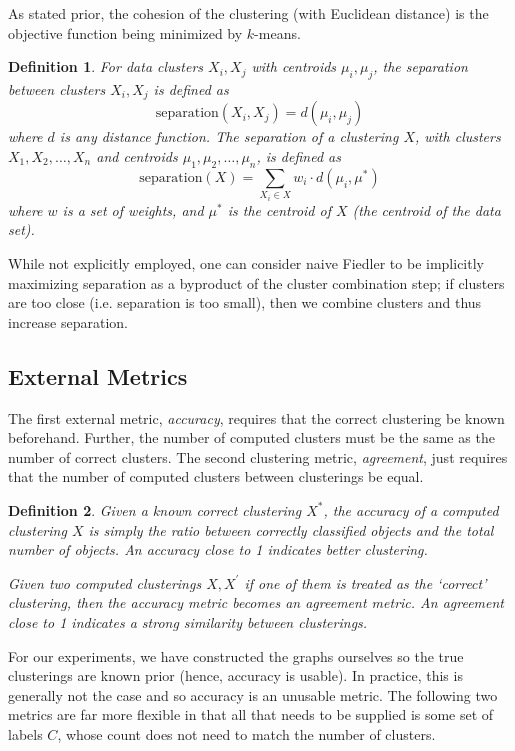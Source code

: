 \documentclass[11pt, letterpaper]{article}
\theoremstyle{perchance}
\newtheorem*{definition}{Definition}
\begin{document}
        As stated prior, the cohesion of the clustering (with Euclidean distance) is the objective function being minimized by $k$-means.
        
        \begin{definition}
            For data clusters $X_i, X_j$ with centroids $\mu_i, \mu_j$, the \emph{separation} between clusters $X_i, X_j$ is defined as
            \[\text{separation}(X_i, X_j) = d(\mu_i, \mu_j)\]
            where $d$ is any distance function. The separation of a clustering $X$, with clusters $X_1, X_2, \ldots, X_n$ and centroids $\mu_1, \mu_2, \ldots, \mu_n$, is defined as 
            \[\text{separation}(X) = \sum_{X_i \in X} w_i \cdot d(\mu_i, \mu^*)\]
            where $w$ is a set of weights, and $\mu^*$ is the centroid of $X$ (the centroid of the data set).
        \end{definition}
    
        While not explicitly employed, one can consider naive Fiedler to be implicitly maximizing separation as a byproduct of the cluster combination step; if clusters are too close (i.e. separation is too small), then we combine clusters and thus increase separation.

    \subsection{External Metrics}

        The first external metric, \emph{accuracy}, requires that the correct clustering be known beforehand. Further, the number of computed clusters must be the same as the number of correct clusters. The second clustering metric, \emph{agreement}, just requires that the number of computed clusters between clusterings be equal.
        
        \begin{definition}
            Given a known correct clustering $X^*$, the \emph{accuracy} of a computed clustering $X$ is simply the ratio between correctly classified objects and the total number of objects. An accuracy close to 1 indicates better clustering. 
            
            Given two computed clusterings $X, X^\prime$ if one of them is treated as the `correct' clustering, then the accuracy metric becomes an \emph{agreement} metric. An agreement close to 1 indicates a strong similarity between clusterings.
        \end{definition}
    
        For our experiments, we have constructed the graphs ourselves so the true clusterings are known prior (hence, accuracy is usable). In practice, this is generally not the case and so accuracy is an unusable metric. The following two metrics are far more flexible in that all that needs to be supplied is some set of labels $C$, whose count does not need to match the number of clusters.
    
\end{document}
